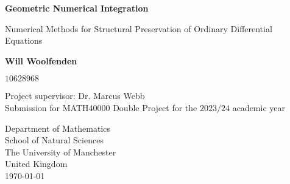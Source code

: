 \begin{titlepage}
    \begin{center}
        \vspace*{1cm}
            
        \Huge
        \textbf{Geometric Numerical Integration}
            
        \vspace{0.5cm}
        \LARGE
        Numerical Methods for Structural Preservation of Ordinary Differential Equations
            
        \vspace{1.5cm}
            
        \textbf{Will Woolfenden}
        
        \vspace{0.5cm}
        
        $10628968$
            
        \vfill

        Project supervisor: Dr. Marcus Webb \\

        \vspace{0.8cm}
        Submission for MATH40000 Double Project for the $2023/24$ academic year
            
        \vspace{0.8cm}
            
        \Large
        
        Department of Mathematics \\
        School of Natural Sciences\\
        The University of Manchester\\
        United Kingdom\\
        \today
    \end{center}
\end{titlepage}